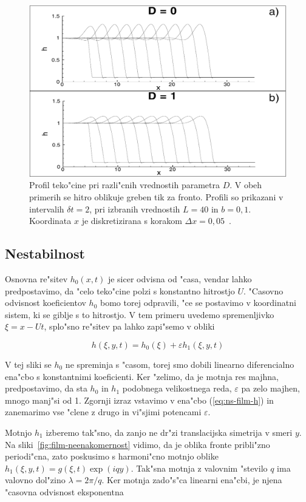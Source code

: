 \documentclass[a4paper,12pt]{article}
\newcommand{\eps}{\varepsilon}
\begin{document}
\begin{figure}[h]
 \centering
 \includegraphics[width=.8\textwidth]{./Slike/film-osnovna-resitev}
 \caption{Profil teko"cine pri razli"cnih vrednostih parametra $D$. V obeh primerih se hitro oblikuje greben tik za fronto. Profili so prikazani v intervalih $\delta t = 2$, pri izbranih vrednostih $L = 40$ in $b=0,1$. Koordinata $x$ je diskretizirana s korakom $\Delta x = 0,05$~\cite{kondic}. }
 \label{fig:film-osnovna}
\end{figure}

\subsection{Nestabilnost}

Osnovna re"sitev $h_0(x, t)$ je sicer odvisna od "casa, vendar lahko predpostavimo, da "celo teko"cine polzi s konstantno hitrostjo $U$. "Casovno odvisnost koeficientov $h_0$ bomo torej odpravili, "ce se postavimo v koordinatni sistem, ki se giblje s to hitrostjo. V tem primeru uvedemo spremenljivko $\xi = x - Ut$, splo"sno re"sitev pa lahko zapi"semo v obliki

\begin{equation}
 h(\xi, y, t) = h_0(\xi) + \eps h_1(\xi, y, t)
\end{equation}

V tej sliki se $h_0$ ne spreminja s "casom, torej smo dobili linearno diferencialno ena"cbo s konstantnimi koeficienti. Ker "zelimo, da je motnja res majhna, predpostavimo, da sta $h_0$ in $h_1$ podobnega velikostnega reda, $\eps$ pa zelo majhen, mnogo manj"si od 1. Zgornji izraz vstavimo v ena"cbo (\ref{eq:ns-film-h}) in zanemarimo vse "clene z drugo in vi"sjimi potencami $\eps$. 

Motnjo $h_1$ izberemo tak"sno, da zanjo ne dr"zi translacijska simetrija v smeri $y$. Na sliki~\ref{fig:film-neenakomernost} vidimo, da je oblika fronte pribli"zno periodi"cna, zato poskusimo s harmoni"cno motnjo oblike $h_1(\xi, y, t) = g(\xi, t) \exp (i q y)$. Tak"sna motnja z valovnim "stevilo $q$ ima valovno dol"zino $\lambda = 2\pi/q$. Ker motnja zado"s"ca linearni ena"cbi, je njena "casovna odvisnost eksponentna
\end{document}

